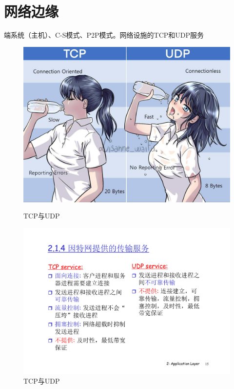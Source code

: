 \documentclass[]{report}
\begin{document}
	\section{网络边缘}
		端系统（主机）、C-S模式、P2P模式。网络设施的TCP和UDP服务
		\begin{figure}[h!]
			\centering
			\begin{minipage}{20em}
				\centering
				\includegraphics[scale = 0.13]{images/TCP_and_UDP.jpg}
				\caption{TCP与UDP}
			\end{minipage}
			\begin{minipage}{20em}
				\centering
				\includegraphics[scale = 0.27]{images/TCP_and_UDP_2.pdf}
				\caption{TCP与UDP}
			\end{minipage}
		\end{figure}
\end{document}
